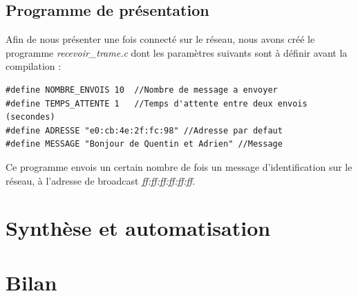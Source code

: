 \documentclass[a4paper,11pt]{article}
\begin{document}
	\subsection{Programme de présentation}
	Afin de nous présenter une fois connecté sur le réseau, nous avons créé le programme \textit{recevoir\_trame.c} dont les paramètres suivants sont à définir avant la compilation :
	\lstset{language=C}
\begin{lstlisting}
#define NOMBRE_ENVOIS 10  //Nombre de message a envoyer
#define TEMPS_ATTENTE 1	  //Temps d'attente entre deux envois (secondes)
#define ADRESSE "e0:cb:4e:2f:fc:98" //Adresse par defaut
#define MESSAGE "Bonjour de Quentin et Adrien" //Message
\end{lstlisting}
	Ce programme envois un certain nombre de fois un message d'identification sur le réseau, à l'adresse de broadcast \textit{ff:ff:ff:ff:ff:ff}.
	
	
	
	
	\section{Synthèse et automatisation}
	\section{Bilan}
\end{document}
